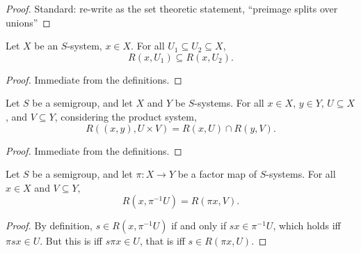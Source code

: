 \begin{proof}
\leanok{}
    Standard: re-write as the set theoretic statement, ``preimage splits over unions''
\end{proof}

\begin{lemma}
\label{lemma_monotonicity_of_rts}
\leanok{}
Let $X$ be an $S$-system, $x \in X$.  For all $U_1 \subseteq U_2 \subseteq X$,
\[R(x,U_1) \subseteq R(x,U_2).\]
\end{lemma}

\begin{proof}
\leanok{}
    Immediate from the definitions.
\end{proof}

\begin{lemma}
\label{lemma_return_time_sets_in_prod_system}
\leanok{}
Let $S$ be a semigroup, and let $X$ and $Y$ be $S$-systems.  For all $x \in X$, $y \in Y$, $U \subseteq X$, and $V \subseteq Y$, considering the product system,
\[R((x,y), U \times V) = R(x, U) \cap R(y,V).\]
\end{lemma}

\begin{proof}
\leanok{}
    Immediate from the definitions.
\end{proof}

\begin{theorem}
\label{thm_visit_time_thru_factor}
\leanok{}
    Let $S$ be a semigroup, and let $\pi: X \to Y$ be a factor map of $S$-systems.  For all $x \in X$ and $V \subseteq Y$,
    \[R(x,\pi^{-1} U) = R(\pi x, V).\]
\end{theorem}

\begin{proof}
\leanok{}
    By definition, $s \in R(x,\pi^{-1} U)$ if and only if $sx \in \pi^{-1} U$, which holds iff $\pi s x \in U$.  But this is iff $s \pi x \in U$, that is iff $s \in R(\pi x, U)$.
\end{proof}



